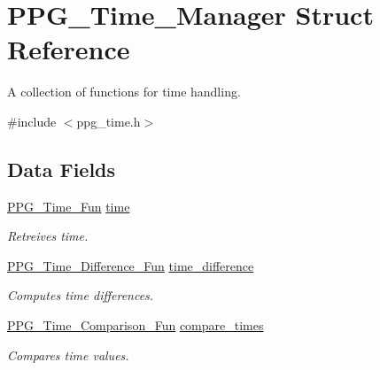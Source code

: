 \hypertarget{structPPG__Time__Manager}{\section{P\-P\-G\-\_\-\-Time\-\_\-\-Manager Struct Reference}
\label{structPPG__Time__Manager}
}


A collection of functions for time handling.  




{\ttfamily \#include $<$ppg\-\_\-time.\-h$>$}

\subsection*{Data Fields}
\begin{DoxyCompactItemize}
\item 
\hypertarget{structPPG__Time__Manager_ab157f879881095072d176da8e5b4e0a6}{\hyperlink{ppg__time_8h_a8e4f2ba27061e8c93153365f166a0fde}{P\-P\-G\-\_\-\-Time\-\_\-\-Fun} \hyperlink{structPPG__Time__Manager_ab157f879881095072d176da8e5b4e0a6}{time}}\label{structPPG__Time__Manager_ab157f879881095072d176da8e5b4e0a6}

\begin{DoxyCompactList}\small\item\em Retreives time. \end{DoxyCompactList}\item 
\hypertarget{structPPG__Time__Manager_ae3f6c502362de05de4152ef50e9a9408}{\hyperlink{ppg__time_8h_a207456c8ce743b89febbfc22e80de160}{P\-P\-G\-\_\-\-Time\-\_\-\-Difference\-\_\-\-Fun} \hyperlink{structPPG__Time__Manager_ae3f6c502362de05de4152ef50e9a9408}{time\-\_\-difference}}\label{structPPG__Time__Manager_ae3f6c502362de05de4152ef50e9a9408}

\begin{DoxyCompactList}\small\item\em Computes time differences. \end{DoxyCompactList}\item 
\hypertarget{structPPG__Time__Manager_aaca0343032df865cc82c5d0aac3de1d3}{\hyperlink{ppg__time_8h_abf5350317f101a5f50d9fdac7c37a682}{P\-P\-G\-\_\-\-Time\-\_\-\-Comparison\-\_\-\-Fun} \hyperlink{structPPG__Time__Manager_aaca0343032df865cc82c5d0aac3de1d3}{compare\-\_\-times}}\label{structPPG__Time__Manager_aaca0343032df865cc82c5d0aac3de1d3}

\begin{DoxyCompactList}\small\item\em Compares time values. \end{DoxyCompactList}\end{DoxyCompactItemize}


